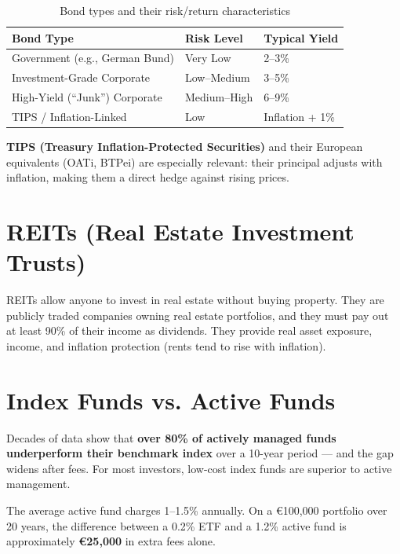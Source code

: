 \documentclass[12pt, a4paper]{book}
\begin{document}
\begin{table}[h!]
\centering
\begin{tabular}{lll}
\toprule
\textbf{Bond Type} & \textbf{Risk Level} & \textbf{Typical Yield} \\
\midrule
Government (e.g., German Bund) & Very Low & 2--3\% \\
Investment-Grade Corporate & Low--Medium & 3--5\% \\
High-Yield (``Junk'') Corporate & Medium--High & 6--9\% \\
TIPS / Inflation-Linked & Low & Inflation + 1\% \\
\bottomrule
\end{tabular}
\caption{Bond types and their risk/return characteristics}
\end{table}

\textbf{TIPS (Treasury Inflation-Protected Securities)} and their European equivalents (OATi, BTPei) are especially relevant: their principal adjusts with inflation, making them a direct hedge against rising prices.

\section{REITs (Real Estate Investment Trusts)}

REITs allow anyone to invest in real estate without buying property. They are publicly traded companies owning real estate portfolios, and they must pay out at least 90\% of their income as dividends. They provide real asset exposure, income, and inflation protection (rents tend to rise with inflation).

\section{Index Funds vs. Active Funds}

\begin{keybox}
Decades of data show that \textbf{over 80\% of actively managed funds underperform their benchmark index} over a 10-year period --- and the gap widens after fees. For most investors, low-cost index funds are superior to active management.
\end{keybox}

The average active fund charges 1--1.5\% annually. On a \euro{}100{,}000 portfolio over 20 years, the difference between a 0.2\% ETF and a 1.2\% active fund is approximately \textbf{\euro{}25{,}000} in extra fees alone.

\end{document}
